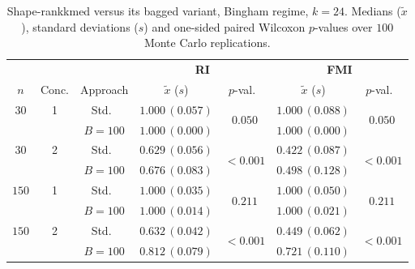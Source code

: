 \documentclass[11pt,a4paper]{article}
\begin{document}
\begin{table}[h]
\centering
\caption{Shape-rankkmed versus its bagged variant, Bingham regime, $k=24$. Medians ($\tilde x$), standard deviations ($s$) and one-sided paired Wilcoxon $p$-values over $100$ Monte Carlo replications.}
\label{tab:rkm-bing-k24}
\footnotesize
\begin{tabular}{cc c cc cc}
\toprule
& & & \multicolumn{2}{c}{\textbf{RI}} & \multicolumn{2}{c}{\textbf{FMI}} \\
\cmidrule(lr){4-5}\cmidrule(lr){6-7}
$n$ & Conc. & Approach & $\tilde x$ ($s$) & $p$-val.\ & $\tilde x$ ($s$) & $p$-val.\ \\
\midrule
$30$ & 1 & Std.\ & $1.000\,(0.057)$ & \multirow{2}{*}{$0.050$} & $1.000\,(0.088)$ & \multirow{2}{*}{$0.050$} \\
     &   & $B{=}100$ & $1.000\,(0.000)$ & & $1.000\,(0.000)$ & \\
$30$ & 2 & Std.\ & $0.629\,(0.056)$ & \multirow{2}{*}{$\mathbf{<\!0.001}$} & $0.422\,(0.087)$ & \multirow{2}{*}{$\mathbf{<\!0.001}$} \\
     &   & $B{=}100$ & $0.676\,(0.083)$ & & $0.498\,(0.128)$ & \\
$150$ & 1 & Std.\ & $1.000\,(0.035)$ & \multirow{2}{*}{$0.211$} & $1.000\,(0.050)$ & \multirow{2}{*}{$0.211$} \\
     &   & $B{=}100$ & $1.000\,(0.014)$ & & $1.000\,(0.021)$ & \\
$150$ & 2 & Std.\ & $0.632\,(0.042)$ & \multirow{2}{*}{$\mathbf{<\!0.001}$} & $0.449\,(0.062)$ & \multirow{2}{*}{$\mathbf{<\!0.001}$} \\
     &   & $B{=}100$ & $0.812\,(0.079)$ & & $0.721\,(0.110)$ & \\
\bottomrule
\end{tabular}
\end{table}
\end{document}
